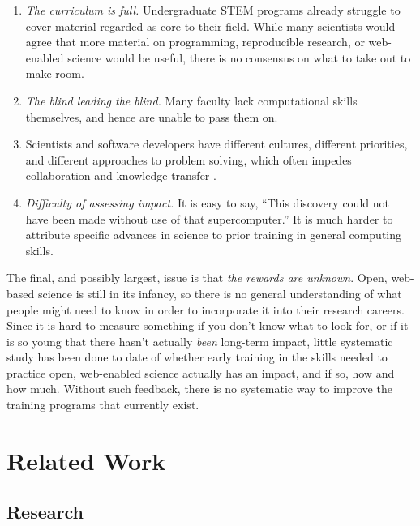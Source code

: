 \documentclass[11pt]{article}
\begin{document}
\begin{enumerate}

\item
  \emph{The curriculum is full.}  Undergraduate STEM programs already
  struggle to cover material regarded as core to their field.  While
  many scientists would agree that more material on programming,
  reproducible research, or web-enabled science would be useful, there
  is no consensus on what to take out to make room.

\item
  \emph{The blind leading the blind.}  Many faculty lack computational
  skills themselves, and hence are unable to pass them on.

\item
  Scientists and software developers have different cultures,
  different priorities, and different approaches to problem solving,
  which often impedes collaboration and knowledge transfer
  \cite{segal2005a}.

\item
  \emph{Difficulty of assessing impact.} It is easy to say, ``This
  discovery could not have been made without use of that
  supercomputer.''  It is much harder to attribute specific advances
  in science to prior training in general computing skills.

\end{enumerate}

The final, and possibly largest, issue is that \emph{the rewards are
  unknown}.  Open, web-based science is still in its infancy, so there
is no general understanding of what people might need to know in order
to incorporate it into their research careers.  Since it is hard to
measure something if you don't know what to look for, or if it is so
young that there hasn't actually \emph{been} long-term impact, little
systematic study has been done to date of whether early training in
the skills needed to practice open, web-enabled science actually has
an impact, and if so, how and how much.  Without such feedback, there
is no systematic way to improve the training programs that currently
exist.

\section{Related Work}

\subsection{Research}
\end{document}

